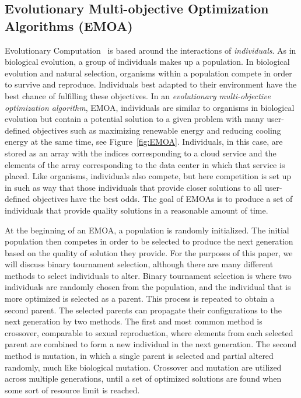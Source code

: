 \documentclass{sig-alternate}
\begin{document}
\subsection{Evolutionary Multi-objective Optimization Algorithms (EMOA)}
\label{sec:EMOA}

Evolutionary Computation~\cite{poli08:fieldguide} is based around the interactions of \emph{individuals}.  As in biological evolution, a group of individuals makes up a population. In biological evolution and natural selection, organisms within a population compete in order to survive and reproduce. Individuals best adapted to their environment have the best chance of fulfilling these objectives. In an \emph{evolutionary multi-objective optimization algorithm}, EMOA, individuals are similar to organisms in biological evolution but contain a potential solution to a given problem with many user-defined objectives such as maximizing renewable energy and reducing cooling energy at the same time, see Figure~\ref{fig:EMOA}. Individuals, in this case, are stored as an array with the indices corresponding to a cloud service and the elements of the array corresponding to the data center in which that service is placed.  Like organisms, individuals also compete, but here competition is set up in such as way that those individuals that provide closer solutions to all user-defined objectives have the best odds. The goal of EMOAs is to produce a set of individuals that provide quality solutions in a reasonable amount of time. 

At the beginning of an EMOA, a population is randomly initialized. The initial population then competes in order to be selected to produce the next generation based on the quality of solution they provide. For the purposes of this paper, we will discuss binary tournament selection, although there are many different methods to select individuals to alter. Binary tournament selection is where two individuals are randomly chosen from the population, and the individual that is more optimized is selected as a parent. This process is repeated to obtain a second parent.  The selected parents can propagate their configurations to the next generation by two methods. The first and most common method is crossover, comparable to sexual reproduction, where elements from each selected parent are combined to form a new individual in the next generation. The second method is mutation, in which a single parent is selected and partial altered randomly, much like biological mutation. Crossover and mutation are utilized across multiple generations, until a set of optimized solutions are found when some sort of resource limit is reached. %
\end{document}
